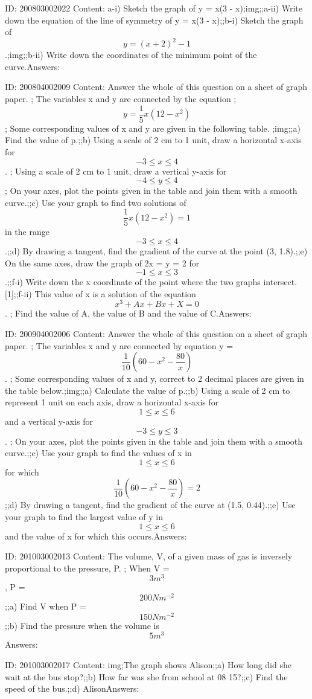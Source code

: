 \documentclass{article}
\begin{document}
ID: 200803002022
Content:
a-i) Sketch the graph of y = x(3 - x);img;;a-ii) Write down the equation of the line of symmetry of y = x(3 - x);;b-i) Sketch the graph of $$y = (x + 2)^2 - 1$$.;img;;b-ii) Write down the coordinates of the minimum point of the curve.Answers:

ID: 200804002009
Content:
Answer the whole of this question on a sheet of graph paper. ; The variables x and y are connected by the equation ; $$y = \frac{1}{5}x(12 - x^2)$$ ; Some corresponding values of x and y are given in the following table. ;img;;a) Find the value of p.;;b) Using a scale of 2 cm to 1 unit, draw a horizontal x-axis for $$-3 \leq x \leq 4$$. ; Using a scale of 2 cm to 1 unit, draw a vertical y-axis for $$-4 \leq y \leq 4$$ ; On your axes, plot the points given in the table and join them with a smooth curve.;;c) Use your graph to find two solutions of $$\frac{1}{5}x(12 - x^2) = 1$$ in the range $$-3 \leq x \leq 4$$.;;d) By drawing a tangent, find the gradient of the curve at the point (3, 1.8).;;e) On the same axes, draw the graph of 2x = y = 2 for $$-1 \leq x \leq 3$$.;;f-i) Write down the x coordinate of the point where the two graphs intersect.   [1];;f-ii) This value of x is a solution of the equation $$x^3 + Ax + Bx + X = 0$$. ; Find the value of A, the value of B and the value of C.Answers:

ID: 200904002006
Content:
Answer the whole of this question on a sheet of graph paper. ; The variables x and y are connected by equation y = $$\frac{1}{10} (60 - x^2 - \frac{80}{x})$$. ; Some corresponding values of x and y, correct to 2 decimal places are given in the table below.;img;;a) Calculate the value of p.;;b) Using a scale of 2 cm to represent 1 unit on each axis, draw a horizontal x-axis for $$1 \leq x \leq 6$$ and a vertical y-axis for $$-3 \leq y \leq 3$$. ; On your axes, plot the points given in the table and join them with a smooth curve.;;c) Use your graph to find the values of x in $$1 \leq x \leq 6$$ for which $$\frac{1}{10}(60 - x^2 - \frac{80}{x}) = 2$$;;d) By drawing a tangent, find the gradient of the curve at (1.5, 0.44).;;e) Use your graph to find the largest value of y in $$1 \leq x \leq 6$$ and the value of x for which this occurs.Answers:

ID: 201003002013
Content:
The volume, V, of a given mass of gas is inversely proportional to the pressure, P. ; When V = $$3 m^3$$, P = $$200 Nm^{-2}$$;;a) Find V when P = $$150 Nm^{-2}$$;;b) Find the pressure when the volume is $$5 m^3$$Answers:

ID: 201003002017
Content:
img;The graph shows Alison;;a) How long did she wait at the bus stop?;;b) How far was she from school at 08 15?;;c) Find the speed of the bus.;;d) AlisonAnswers:
\end{document}

